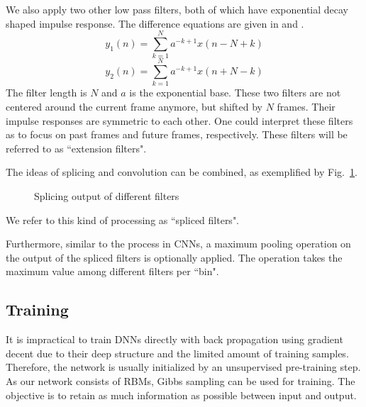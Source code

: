 \documentclass{article}
\begin{document}
We also apply two other low pass filters, both of which have exponential decay shaped impulse response. The difference equations are given in  and . 
\begin{equation}\label{filter1}
y_{1}(n) = \sum_{k=1}^N a^{-k+1} x(n-N+k)
\end{equation}
\begin{equation}\label{filter2}
y_{2}(n) = \sum_{k=1}^N a^{-k+1} x(n+N-k)
\end{equation} 
The filter length is $N$ and $a$ is the exponential base. 
These two filters are not centered around the current frame anymore, but shifted by $N$ frames. Their impulse responses are symmetric to each other. One could interpret these filters as to focus on past frames and future frames, respectively. These filters will be referred to as ``extension filters". 

The ideas of splicing and convolution can be combined, as exemplified by Fig.~\ref{fig:filtersplice}.
\begin{figure}
 \centerline{}
 \caption{Splicing output of different filters}
 \label{fig:filtersplice}
\end{figure}
We refer to this kind of processing as ``spliced filters".

Furthermore, similar to the process in CNNs, a maximum pooling operation on the output of the spliced filters is optionally applied. The operation takes the maximum value among different filters per ``bin". 
 
\subsection{Training}\label{sec:train}
It is impractical to train DNNs directly with back propagation using gradient decent due to their deep structure and the limited amount of training samples. Therefore, the network is usually initialized by an unsupervised pre-training step. As our network consists of RBMs, Gibbs sampling can be used for training. The objective is to retain as much information as possible between input and output. 
\end{document}
